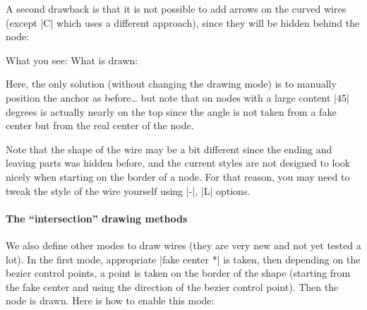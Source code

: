 \documentclass[a4paper]{ltxdoc}
\begin{document}
{A second drawback is that it is not possible to add arrows on the curved wires (except |C| which uses a different approach), since they will be hidden behind the node:
\begin{codeexample}[]
  What you see:
  \zx{\zxZ{\alpha+\beta} \ar[dr,s,<->] \\
                         & \zxZ{\alpha+\beta}}
  What is drawn:
\end{codeexample}
Here, the only solution (without changing the drawing mode) is to manually position the anchor as before\dots{} but note that on nodes with a large content |45| degrees is actually nearly on the top since the angle is not taken from a fake center but from the real center of the node.
\begin{codeexample}[]
  \zx{\zxZ{\alpha+\beta} \ar[dr,s,<->,start anchor=-45,end anchor=180-45] \\
                         & \zxZ{\alpha+\beta}}
  \zx{\zxZ{\alpha+\beta} \ar[dr,s,<->,start anchor=-15,end anchor=180-15] \\
                         & \zxZ{\alpha+\beta}}
\end{codeexample}
 Note that the shape of the wire may be a bit different since the ending and leaving parts was hidden before, and the current styles are not designed to look nicely when starting on the border of a node. For that reason, you may need to tweak the style of the wire yourself using |-|, |L| options.

 \paragraph{The ``intersection'' drawing methods}

 We also define other modes to draw wires (they are very new and not yet tested a lot). In the first mode, appropriate |fake center *| is taken, then depending on the bezier control points, a point is taken on the border of the shape (starting from the fake center and using the direction of the bezier control point). Then the node is drawn. Here is how to enable this mode:

}
\end{document}
